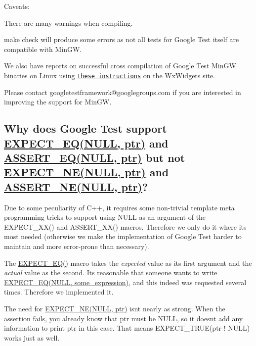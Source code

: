 Caveats\+:


\begin{DoxyItemize}
\item There are many warnings when compiling.
\item {\ttfamily make check} will produce some errors as not all tests for Google Test itself are compatible with Min\+GW.
\end{DoxyItemize}

We also have reports on successful cross compilation of Google Test Min\+GW binaries on Linux using \href{http://wiki.wxwidgets.org/Cross-Compiling_Under_Linux#Cross-compiling_under_Linux_for_MS_Windows}{\tt these instructions} on the Wx\+Widgets site.

Please contact {\ttfamily googletestframework@googlegroups.\+com} if you are interested in improving the support for Min\+GW.

\subsection*{Why does Google Test support \hyperlink{gtest_8h_a4159019abda84f5366acdb7604ff220a}{E\+X\+P\+E\+C\+T\+\_\+\+E\+Q(\+N\+U\+L\+L, ptr)} and \hyperlink{gtest_8h_a1a6db8b1338ee7040329322b77779086}{A\+S\+S\+E\+R\+T\+\_\+\+E\+Q(\+N\+U\+L\+L, ptr)} but not \hyperlink{gtest_8h_a6ae7443947f25abc58bfcfcfc56b0d75}{E\+X\+P\+E\+C\+T\+\_\+\+N\+E(\+N\+U\+L\+L, ptr)} and \hyperlink{gtest_8h_aa866c8dece57912e6f51495ed3e8d8d5}{A\+S\+S\+E\+R\+T\+\_\+\+N\+E(\+N\+U\+L\+L, ptr)}?}

Due to some peculiarity of C++, it requires some non-\/trivial template meta programming tricks to support using {\ttfamily N\+U\+LL} as an argument of the {\ttfamily E\+X\+P\+E\+C\+T\+\_\+\+X\+X()} and {\ttfamily A\+S\+S\+E\+R\+T\+\_\+\+X\+X()} macros. Therefore we only do it where it\textquotesingle{}s most needed (otherwise we make the implementation of Google Test harder to maintain and more error-\/prone than necessary).

The {\ttfamily \hyperlink{gtest_8h_a4159019abda84f5366acdb7604ff220a}{E\+X\+P\+E\+C\+T\+\_\+\+E\+Q()}} macro takes the {\itshape expected} value as its first argument and the {\itshape actual} value as the second. It\textquotesingle{}s reasonable that someone wants to write {\ttfamily \hyperlink{gtest_8h_a4159019abda84f5366acdb7604ff220a}{E\+X\+P\+E\+C\+T\+\_\+\+E\+Q(\+N\+U\+L\+L, some\+\_\+expression)}}, and this indeed was requested several times. Therefore we implemented it.

The need for {\ttfamily \hyperlink{gtest_8h_a6ae7443947f25abc58bfcfcfc56b0d75}{E\+X\+P\+E\+C\+T\+\_\+\+N\+E(\+N\+U\+L\+L, ptr)}} isn\textquotesingle{}t nearly as strong. When the assertion fails, you already know that {\ttfamily ptr} must be {\ttfamily N\+U\+LL}, so it doesn\textquotesingle{}t add any information to print ptr in this case. That means {\ttfamily E\+X\+P\+E\+C\+T\+\_\+\+T\+R\+UE(ptr ! N\+U\+LL)} works just as well.


